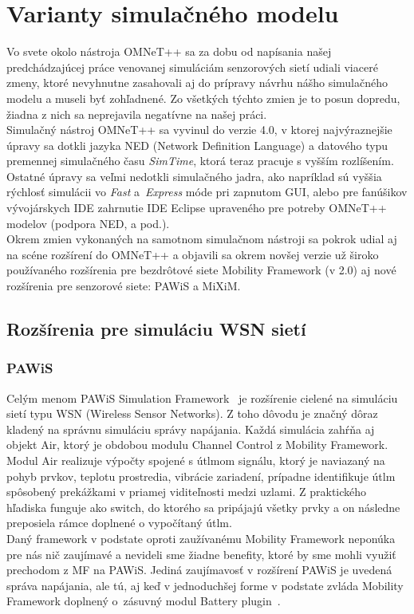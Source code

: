 \chapter{Varianty simulačného modelu}

\indent\indent Vo svete okolo nástroja OMNeT++ sa za dobu od napísania našej predchádzajúcej práce venovanej simuláciám senzorových sietí udiali viaceré zmeny, ktoré nevyhnutne zasahovali aj do prípravy návrhu nášho simulačného modelu a museli byť zohľadnené. Zo všetkých týchto zmien je to posun dopredu, žiadna z nich sa neprejavila negatívne na našej práci.\\
\indent Simulačný nástroj OMNeT++ sa vyvinul do verzie 4.0, v ktorej najvýraznejšie úpravy sa dotkli jazyka NED (Network Definition Language) a datového typu premennej simulačného času \textit{SimTime}, ktorá teraz pracuje s vyšším rozlíšením. Ostatné úpravy sa veľmi nedotkli simulačného jadra, ako napríklad sú vyššia rýchlosť simulácii vo \textit{Fast} a~\textit{Express} móde pri zapnutom GUI, alebo pre fanúšikov vývojárskych IDE zahrnutie IDE Eclipse upraveného pre potreby OMNeT++ modelov (podpora NED, a pod.).\\
\indent Okrem zmien vykonaných na samotnom simulačnom nástroji sa pokrok udial aj na scéne rozšírení do OMNeT++ a objavili sa okrem novšej verzie už široko používaného rozšírenia pre bezdrôtové siete Mobility Framework (v 2.0) aj nové rozšírenia pre senzorové siete: PAWiS a MiXiM.\\

\section{Rozšírenia pre simuláciu WSN sietí}
\subsection{PAWiS}
\indent\indent Celým menom PAWiS Simulation Framework~\cite{pawis05} je rozšírenie cielené na simuláciu sietí typu WSN (Wireless Sensor Networks). Z toho dôvodu je značný dôraz kladený na správnu simuláciu správy napájania. Každá simulácia zahŕňa aj objekt \ttfamily Air\rmfamily, ktorý je obdobou modulu \ttfamily Channel Control \rmfamily z Mobility Framework. Modul \ttfamily Air \rmfamily realizuje výpočty spojené s útlmom signálu, ktorý je naviazaný na pohyb prvkov, teplotu prostredia, vibrácie zariadení, prípadne identifikuje útlm spôsobený prekážkami v priamej viditeľnosti medzi uzlami. Z praktického hľadiska funguje ako switch, do ktorého sa pripájajú všetky prvky a on následne preposiela rámce doplnené o vypočítaný útlm.\\
\indent Daný framework v podstate oproti zaužívanému Mobility Framework neponúka pre nás nič zaujímavé a nevideli sme žiadne benefity, ktoré by sme mohli využiť prechodom z MF na PAWiS. Jediná zaujímavosť v rozšírení PAWiS je uvedená správa napájania, ale tú, aj keď v jednoduchšej forme v podstate zvláda Mobility Framework doplnený o~zásuvný modul Battery plugin~\cite{forster08}.\\
